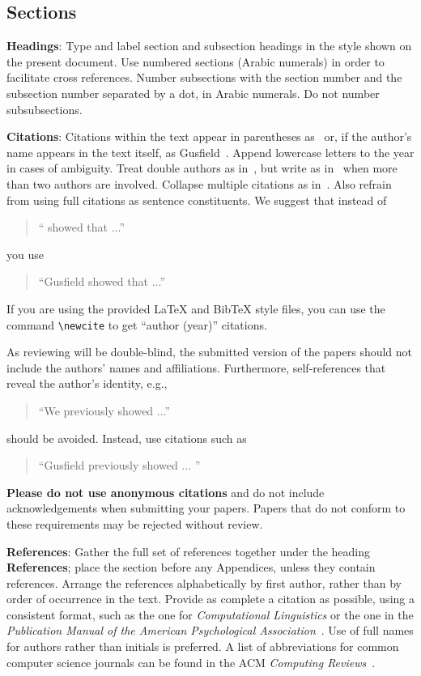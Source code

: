 \documentclass[11pt]{article}
\begin{document}
\subsection{Sections}

{\bf Headings}: Type and label section and subsection headings in the
style shown on the present document.  Use numbered sections (Arabic
numerals) in order to facilitate cross references. Number subsections
with the section number and the subsection number separated by a dot,
in Arabic numerals. Do not number subsubsections.

{\bf Citations}: Citations within the text appear in parentheses
as~\cite{Gusfield:97} or, if the author's name appears in the text
itself, as Gusfield~.  Append lowercase letters
to the year in cases of ambiguity.  Treat double authors as
in~\cite{Aho:72}, but write as in~\cite{Chandra:81} when more than two
authors are involved. Collapse multiple citations as
in~\cite{Gusfield:97,Aho:72}. Also refrain from using full citations
as sentence constituents. We suggest that instead of
\begin{quote}
  ``\cite{Gusfield:97} showed that ...''
\end{quote}
you use
\begin{quote}
``Gusfield    showed that ...''
\end{quote}

If you are using the provided \LaTeX{} and Bib\TeX{} style files, you
can use the command \verb|\newcite| to get ``author (year)'' citations.

As reviewing will be double-blind, the submitted version of the papers
should not include the authors' names and affiliations. Furthermore,
self-references that reveal the author's identity, e.g.,
\begin{quote}
``We previously showed \cite{Gusfield:97} ...''  
\end{quote}
should be avoided. Instead, use citations such as 
\begin{quote}
``Gusfield 
previously showed ... ''
\end{quote}

\textbf{Please do not use anonymous citations} and do not include
acknowledgements when submitting your papers. Papers that do not
conform to these requirements may be rejected without review.

\textbf{References}: Gather the full set of references together under
the heading {\bf References}; place the section before any Appendices,
unless they contain references. Arrange the references alphabetically
by first author, rather than by order of occurrence in the text.
Provide as complete a citation as possible, using a consistent format,
such as the one for {\em Computational Linguistics\/} or the one in the 
{\em Publication Manual of the American 
Psychological Association\/}~\cite{APA:83}.  Use of full names for
authors rather than initials is preferred.  A list of abbreviations
for common computer science journals can be found in the ACM 
{\em Computing Reviews\/}~\cite{ACM:83}.
\end{document}
